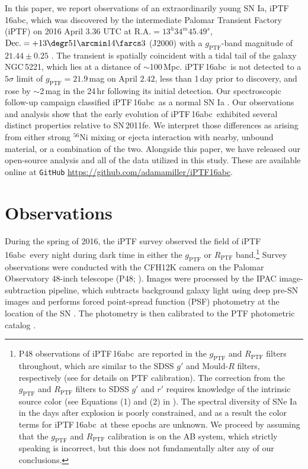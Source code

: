\documentclass[twocolumn]{aastex61}
\newcommand{\abc}{iPTF\,16abc}
\begin{document}
In this paper, we report observations of an extraordinarily young SN Ia,
\abc, which was discovered by the intermediate Palomar Transient Factory
(iPTF) on 2016 April $3.36$ UTC at $\textrm{R.A.}=13^h34^m45.49^s$,
$\textrm{Dec.}=+13\degr51\arcmin14\farcs3$ (J2000) with a
$g_\mathrm{PTF}$-band magnitude of $21.44\pm0.25$
\citep{2016ATel.8907....1M}. The transient is spatially coincident with a
tidal tail of the galaxy NGC\,5221, which lies at a distance of
$\sim$100\,Mpc. \abc\ is not detected to a $5\sigma$ limit of
$g_\mathrm{PTF}=21.9$\,mag on April $2.42$, less than 1\,day prior to
discovery, and rose by $\sim$2\,mag in the 24\,hr following its initial
detection. Our spectroscopic follow-up campaign classified \abc\ as a normal
SN Ia \citep{2016ATel.8909....1C}. Our observations and analysis show that
the early evolution of \abc\ exhibited several distinct properties relative
to SN\,2011fe. We interpret those differences as arising from either strong
$^{56}$Ni mixing or ejecta interaction with nearby, unbound material, or a
combination of the two. Alongside this paper, we have released our
open-source analysis and all of the data utilized in this study. These are
available online at \texttt{GitHub}
\url{https://github.com/adamamiller/iPTF16abc}.


\section{Observations}
\label{sec:obs}

During the spring of 2016, the iPTF survey observed the field of \abc\ every
night during dark time in either the $g_\mathrm{PTF}$ or $R_\mathrm{PTF}$
band.\footnote{P48 observations of \abc\ are reported in the
$g_\mathrm{PTF}$ and $R_\mathrm{PTF}$ filters throughout, which are similar
to the SDSS $g'$ and Mould-$R$ filters, respectively (see
\citealt{2012PASP..124..854O} for details on PTF calibration). The
correction from the $g_\mathrm{PTF}$ and $R_\mathrm{PTF}$ filters to SDSS
$g'$ and $r'$ requires knowledge of the intrinsic source color (see
Equations (1) and (2) in \citealt{2012PASP..124..854O}). The spectral
diversity of SNe Ia in the days after explosion is poorly constrained, and
as a result the color terms for \abc\ at these epochs are unknown. We
proceed by assuming that the $g_\mathrm{PTF}$ and $R_\mathrm{PTF}$
calibration is on the AB system, which strictly speaking is incorrect, but
this does not fundamentally alter any of our conclusions.} Survey
observations were conducted with the CFH12K camera
\citep{2008SPIE.7014E..4YR} on the Palomar Observatory 48-inch telescope
(P48; \citealt{2009PASP..121.1395L}). Images were processed by the IPAC
image-subtraction pipeline, which subtracts background galaxy light using
deep pre-SN images and performs forced point-spread function (PSF)
photometry at the location of the SN \citep{2017PASP..129a4002M}. The
photometry is then calibrated to the PTF photometric catalog
\citep{2012PASP..124..854O}.
\end{document}
